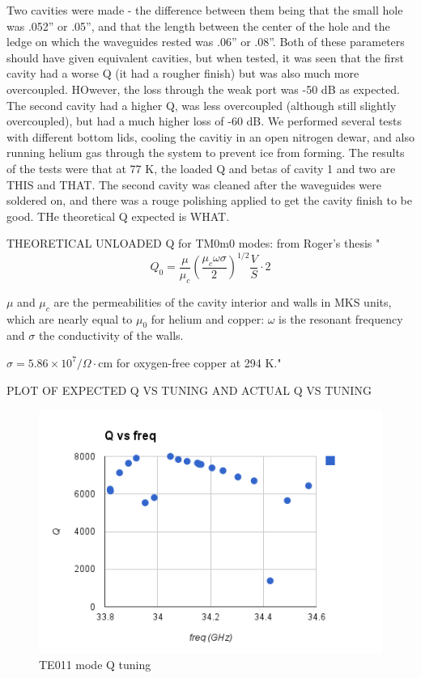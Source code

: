 \documentclass[11pt]{article}
\begin{document}
Two cavities were made - the difference between them being that the small hole was .052” or .05”, and that the length between the center of the hole and the ledge on which the waveguides rested was .06” or .08”. Both of these parameters should have given equivalent cavities, but when tested, it was seen that the first cavity had a worse Q (it had a rougher finish) but was also much more overcoupled. HOwever, the loss through the weak port was -50 dB as expected. The second cavity had a higher Q, was less overcoupled (although still slightly overcoupled), but had a much higher loss of -60 dB. We performed several tests with different bottom lids, cooling the cavitiy in an open nitrogen dewar, and also running helium gas through the system to prevent ice from forming. The results of the tests were that at 77 K, the loaded Q and betas of cavity 1 and two are THIS and THAT. The second cavity was cleaned after the waveguides were soldered on, and there was a rouge polishing applied to get the cavity finish to be good. THe theoretical Q expected is WHAT.

THEORETICAL UNLOADED Q for TM0m0 modes: from Roger's thesis
"
$$Q_0 = \frac{\mu}{\mu_c} (\frac{\mu_c \omega \sigma}{2})^{1/2} \frac{V}{S} \cdot 2 $$

$\mu$ and $\mu_c$ are the permeabilities of the cavity interior and walls in MKS units, which are nearly equal to $\mu_0$ for helium and copper: $\omega$ is the resonant frequency and $\sigma$ the conductivity of the walls.

$\sigma = 5.86 \times 10^{7}/\Omega\cdot\text{cm}$ for oxygen-free copper at 294 K."

PLOT OF EXPECTED Q VS TUNING AND ACTUAL Q VS TUNING
\begin{figure}
\includegraphics[scale=0.7]{Q_vs_freq}
\caption{TE011 mode Q tuning}
\end{figure}
\end{document}
